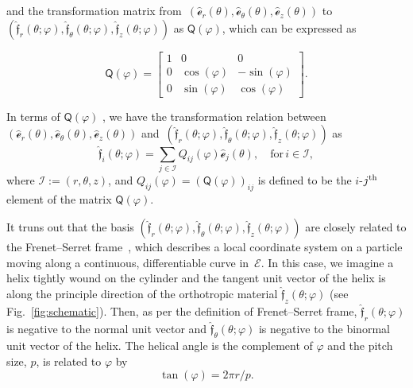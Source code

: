 \documentclass[preprint,12pt,times]{elsarticle}
\numberwithin{equation}{section}
\newcommand{\physe}{\hat{\mathscr{e}}} %
\newcommand{\physf}{\hat{\boldsymbol{\mathfrak{f}}}}
\renewcommand{\u}[1]{\boldsymbol{#1}}
\newcommand{\usf}[1]{\u{\mathsf #1}}
\newcommand{\pr}[1]{\left( #1 \right)}
\renewcommand{\>}{$\Rightarrow$}
\begin{document}
and the transformation matrix from~$(\physe_{r}(\theta),\physe_{\theta}(\theta),\physe_{z}(\theta))$ to~$\pr{\physf_{r}(\theta;\varphi),\physf_{\theta}(\theta;\varphi),\physf_{z}(\theta;\varphi)}$ as $\usf{Q}(\varphi)$, which can be expressed as

\begin{equation}
\usf{Q}(\varphi)
= \begin{bmatrix}
1 & 0 & 0 \\
 0 & \cos(\varphi) & -\sin(\varphi) \\
 0 & \sin(\varphi) & \cos(\varphi)
 \end{bmatrix}.
\end{equation}

In terms of $\usf{Q}(\varphi)$ , we have the transformation relation between~$(\physe_{r}(\theta),\physe_{\theta}(\theta),\physe_{z}(\theta))$ and~$\pr{\physf_{r}(\theta;\varphi),\physf_{\theta}(\theta;\varphi),\physf_{z}(\theta;\varphi)}$ as
\begin{equation}
\physf_{i} (\theta;\varphi) = \sum_{j \in \mathcal{I} } Q_{ij}(\varphi)\physe_{j}(\theta), \quad \text{for} \,i \in \mathcal{I} ,
\label{eq:Qtransform}
\end{equation}
where $\mathcal{I} :=\pr{r,\theta,z}$, and $Q_{ij}(\varphi) = \pr{\usf{Q}(\varphi)}_{ij}$ is defined to be the $i$-$j^{\rm th}$ element of the matrix $\usf{Q}(\varphi)$.

It truns out that the basis $\pr{\physf_{r}(\theta;\varphi),\physf_{\theta}(\theta;\varphi),\physf_{z}(\theta;\varphi)}$ are closely related to the Frenet–Serret frame~\cite{forsyth1912lectures}, which describes a local coordinate system on a particle moving along a continuous, differentiable curve in~$\mathcal{E}$. In this case, we imagine a helix tightly wound on the cylinder and the tangent unit vector of the helix is along the principle direction of the orthotropic material $\physf_{z}(\theta;\varphi)$ (see Fig.~\ref{fig:schematic}). Then, as per the definition of Frenet–Serret frame, $\physf_{r}(\theta;\varphi)$ is negative to the normal unit vector and $\physf_{\theta}(\theta;\varphi)$ is negative to the binormal unit vector of the helix.
The helical angle is the complement of $\varphi$ and the pitch size, $p$, is related to $\varphi$ by
\begin{equation}
\tan(\varphi) = 2 \pi r/p.
\label{eq:AnglePitch}
\end{equation}
\end{document}
